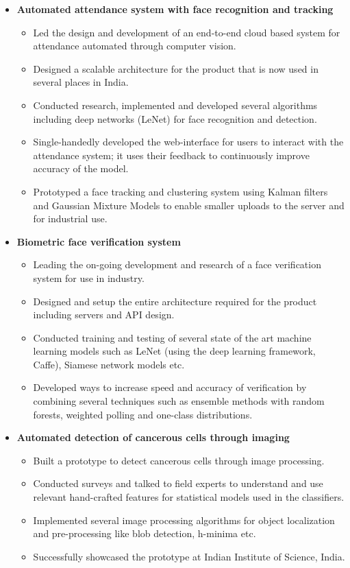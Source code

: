 \documentclass[10pt,letterpaper,sans]{moderncv}        %
\begin{document}
\begin{small}

\begin{itemize}

\item \textbf{Automated attendance system with face recognition and tracking}
\begin{itemize}
\item Led the design and development of an end-to-end cloud based system for attendance automated through computer vision.
\item Designed a scalable architecture for the product that is now used in several places in India.
\item Conducted research, implemented and developed several algorithms including deep networks (LeNet) for face recognition and detection.
\item Single-handedly developed the web-interface for users to interact with the attendance system; it uses their feedback to continuously improve accuracy of the model.
\item Prototyped a face tracking and clustering system using Kalman filters and Gaussian Mixture Models to enable smaller uploads to the server and for industrial use.
\end{itemize}

\item \textbf{Biometric face verification system}
\begin{itemize}
\item Leading the on-going development and research of a face verification system for use in industry.
\item Designed and setup the entire architecture required for the product including servers and API design.
\item Conducted training and testing of several state of the art machine learning models such as LeNet (using the deep learning framework, Caffe), Siamese network models etc.
\item Developed ways to increase speed and accuracy of verification by combining several techniques such as ensemble methods with random forests, weighted polling and one-class distributions.
\end{itemize}

\item \textbf{Automated detection of cancerous cells through imaging}
\begin{itemize}
\item Built a prototype to detect cancerous cells through image processing.
\item Conducted surveys and talked to field experts to understand and use relevant hand-crafted features for statistical models used in the classifiers.
\item Implemented several image processing algorithms for object localization and pre-processing like blob detection, h-minima etc.
\item Successfully showcased the prototype at Indian Institute of Science, India.
\end{itemize}

\end{itemize}
\end{small}
\end{document}
